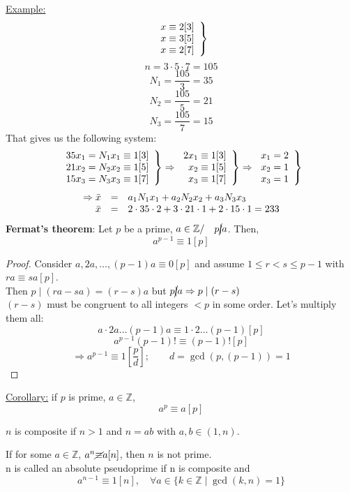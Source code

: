 \documentclass{report}
\begin{document}
\underline{Example:}
\[
\left.
\begin{array}{r c l}
x \equiv 2 [3]\\
x \equiv 3 [5]\\
x \equiv 2 [7]\\
\end{array}
\right \}
\]
\[ n=3 \cdot 5 \cdot 7 = 105 \]
\[N_1=\frac{105}{3}=35\]
\[N_2=\frac{105}{5}=21\]
\[N_3=\frac{105}{7}=15\]
That gives us the following system:
\[
\left.
\begin{array}{r c l}
35x_1=N_1 x_1 \equiv 1[3]\\
21x_2=N_2 x_2 \equiv 1[5]\\
15x_3=N_3 x_3 \equiv 1[7]\\
\end{array}
\right \}
\Rightarrow
\left .
\begin{array}{r c l}
2x_1 \equiv 1[3]\\
x_2 \equiv 1 [5]\\
x_3 \equiv 1 [7]\\
\end{array}
\right \}
\Rightarrow
\left.
\begin{array}{r c l}
x_1=2\\
x_2=1\\
x_3=1\\
\end{array}
\right \}
\]
\[ 
\begin{array}{r c l}
\Rightarrow \bar{x}&=&a_1N_1x_1+a_2N_2x_2+a_3N_3x_3\\
\bar{x}&=& 2 \cdot 35 \cdot 2 + 3 \cdot 21 \cdot 1 + 2 \cdot 15 \cdot 1 = 233\\
\end{array}
\]
\newpage
\large \textbf{Fermat's theorem}: \normalsize
Let $p$ be a prime, $a \in \mathbb{Z} / \quad p \cancel{\mid} a$. Then,
\[ a^{p-1} \equiv 1 [p] \]


\begin{proof}
Consider $a,2a,\dots,(p-1)a \equiv 0 [p]$ and assume $1 \leq r < s \leq p-1$ with $ra \equiv sa [p]$.\\
Then $p \mid (ra-sa) = (r-s)a$ but $p \cancel{\mid} a \Rightarrow p \mid (r-s)$\\
$(r-s)$ must be congruent to all integers $<p$ in some order. Let's multiply them all:\\
\[ a\cdot 2a \dots (p-1)a \equiv 1 \cdot 2 \dots (p-1)[p] \]
\[ a^{p-1}(p-1)! \equiv (p-1)![p]\]
\[ \Rightarrow a^{p-1} \equiv 1 [\frac{p}{d}] ; \qquad d=\gcd(p,(p-1))=1 \]
\end{proof}
\underline{Corollary:} if $p$ is prime, $a \in \mathbb{Z}$, \[ a^p \equiv a [p] \]
\begin{defi} $n$ is composite if $n>1$ and $n=ab$ with $a,b \in (1,n)$.
\end{defi}
\begin{defi} If for some $a \in \mathbb{Z}$, $a^n \cancel{\equiv}a [n]$, then $n$ is not prime.\\
n is called an absolute pseudoprime if n is composite and \[a^{n-1} \equiv 1[n], \quad \forall a\in \{k\in\mathbb{Z}\mid\gcd(k,n)=1 \}\]
\end{defi}
\newpage
\end{document}
